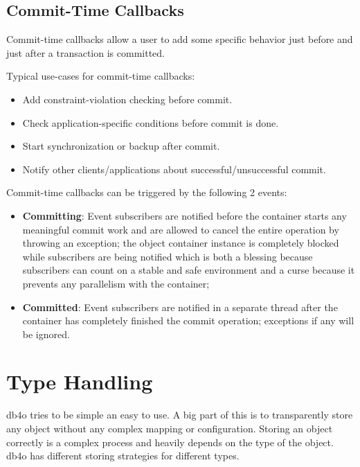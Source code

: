 \subsection{Commit-Time Callbacks}
\label{ref:advanced-topics-callbacks-commit-time-callbacks}

Commit-time callbacks allow a user to add some specific behavior just before and just after a transaction is committed.

Typical use-cases for commit-time callbacks:

\begin{itemize}
\item Add constraint-violation checking before commit.
\item Check application-specific conditions before commit is done.
\item Start synchronization or backup after commit.
\item Notify other clients/applications about successful/unsuccessful commit.
\end{itemize}

Commit-time callbacks can be triggered by the following 2 events:

\begin{itemize}
\item \textbf{Committing}: Event subscribers are notified before the container starts any meaningful commit work and are allowed to cancel the entire operation by throwing an exception; the object container instance is completely blocked while subscribers are being notified which is both a blessing because subscribers can count on a stable and safe environment and a curse because it prevents any parallelism with the container;
\item \textbf{Committed}: Event subscribers are notified in a separate thread after the container has completely finished the commit operation; exceptions if any will be ignored.
\end{itemize}

\section{Type Handling}
\label{ref:advanced-topics-type-handling}

db4o tries to be simple an easy to use. A big part of this is to transparently store any object without any complex mapping or configuration. Storing an object correctly is a complex process and heavily depends on the type of the object. db4o has different storing strategies for different types.

